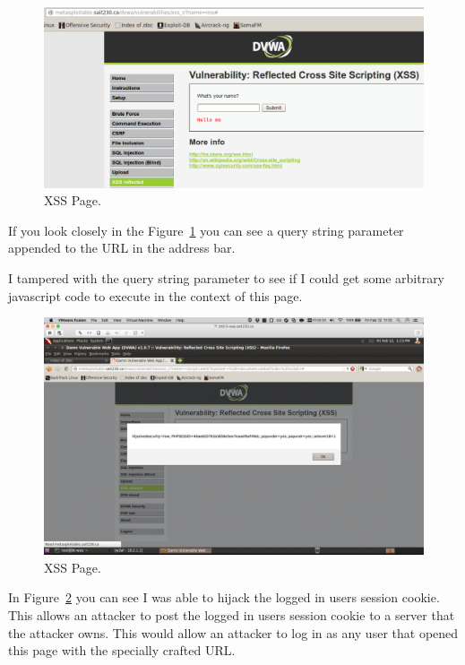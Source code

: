 \documentclass{article}
\begin{document}
\begin{figure}[h!]
	\includegraphics[width=\linewidth]{images/dvwa-xss-page.png}
	\caption{XSS Page.}
	\label{fig:xss-page1}
\end{figure}

If you look closely in the Figure~\ref{fig:xss-page1} you can see a 
query string parameter appended to the URL in the address bar.

\newpage
I tampered with the query string parameter to see if I could get
some arbitrary javascript code to execute in the context of this
page.

\begin{figure}[h!]
	\includegraphics[width=\linewidth]{images/dvwa-xss-page-exploit.png}
	\caption{XSS Page.}
	\label{fig:xss-page2}
\end{figure}

In Figure~\ref{fig:xss-page2} you can see I was able to hijack the logged
in users session cookie. This allows an attacker to post the logged in
users session cookie to a server that the attacker owns. This would allow
an attacker to log in as any user that opened this page with the specially
crafted URL.
\end{document}
